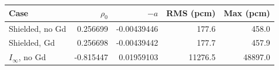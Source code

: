 \begin{center}\small
\begin{tabular}{lrrrr}
\toprule
Case & $\rho_0$ & $-a$ & RMS (pcm) & Max (pcm) \\
\midrule
Shielded, no Gd & 0.256699 & -0.00439446 & 177.6 & 458.0 \\
Shielded, Gd & 0.256698 & -0.00439442 & 177.7 & 457.9 \\
$I_\infty$, no Gd & -0.815447 & 0.01959103 & 11276.5 & 48897.0 \\
\bottomrule
\end{tabular}
\end{center}
